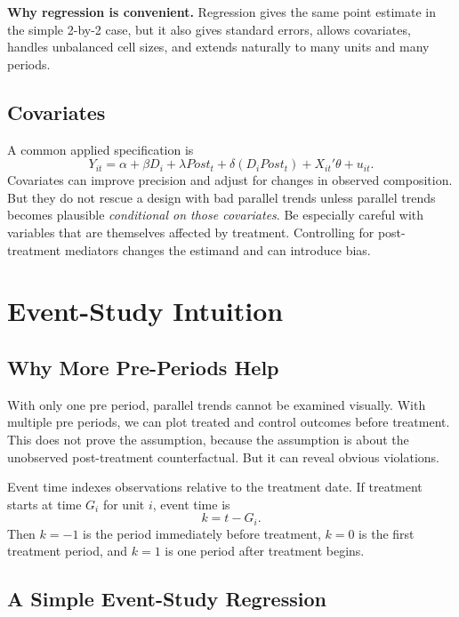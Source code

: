 \begin{boxF}
\textbf{Why regression is convenient.} Regression gives the same point estimate
in the simple 2-by-2 case, but it also gives standard errors, allows covariates,
handles unbalanced cell sizes, and extends naturally to many units and many
periods.
\end{boxF}

\subsection{Covariates}

A common applied specification is
\[
    Y_{it}
    =
    \alpha
    + \beta D_i
    + \lambda Post_t
    + \delta(D_i Post_t)
    + X_{it}'\theta
    + u_{it}.
\]
Covariates can improve precision and adjust for changes in observed
composition. But they do not rescue a design with bad parallel trends unless
parallel trends becomes plausible \emph{conditional on those covariates}. Be
especially careful with variables that are themselves affected by treatment.
Controlling for post-treatment mediators changes the estimand and can introduce
bias.

\section{Event-Study Intuition}

\subsection{Why More Pre-Periods Help}

With only one pre period, parallel trends cannot be examined visually. With
multiple pre periods, we can plot treated and control outcomes before treatment.
This does not prove the assumption, because the assumption is about the
unobserved post-treatment counterfactual. But it can reveal obvious violations.

\begin{defN}
Event time indexes observations relative to the treatment date. If treatment
starts at time $G_i$ for unit $i$, event time is
\[
    k=t-G_i.
\]
Then $k=-1$ is the period immediately before treatment, $k=0$ is the first
treatment period, and $k=1$ is one period after treatment begins.
\end{defN}

\subsection{A Simple Event-Study Regression}

